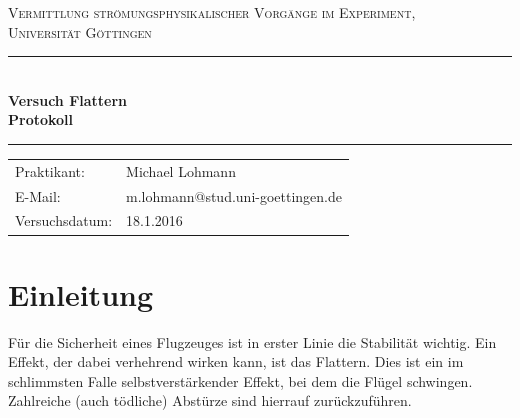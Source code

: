 \documentclass[12pt,a4paper,titlepage,headinclude,bibtotoc]{scrartcl}
\begin{document}
\begin{titlepage}
\centering
\textsc{\Large Vermittlung strömungsphysikalischer Vorgänge im Experiment,
\\[1.5ex] Universität Göttingen}

\vspace*{3cm}

\rule{\textwidth}{1pt}\\[0.5cm]
{\huge \bfseries
  Versuch Flattern  \\[1.5ex]
  Protokoll}\\[0.5cm]
\rule{\textwidth}{1pt}

\vspace*{3cm}

\begin{Large}
\begin{tabular}{ll}
Praktikant: &  Michael Lohmann\\
 E-Mail: & m.lohmann@stud.uni-goettingen.de\\
 Versuchsdatum: & 18.1.2016\\
\end{tabular}
\end{Large}

\vspace*{0.8cm}

\begin{Large}
\end{Large}

\end{titlepage}

\newpage

\section{Einleitung}
Für die Sicherheit eines Flugzeuges ist in erster Linie die Stabilität wichtig.
Ein Effekt, der dabei verhehrend wirken kann, ist das Flattern.
Dies ist ein im schlimmsten Falle selbstverstärkender Effekt, bei dem die Flügel schwingen.
Zahlreiche (auch tödliche) Abstürze sind hierrauf zurückzuführen.
\end{document}
